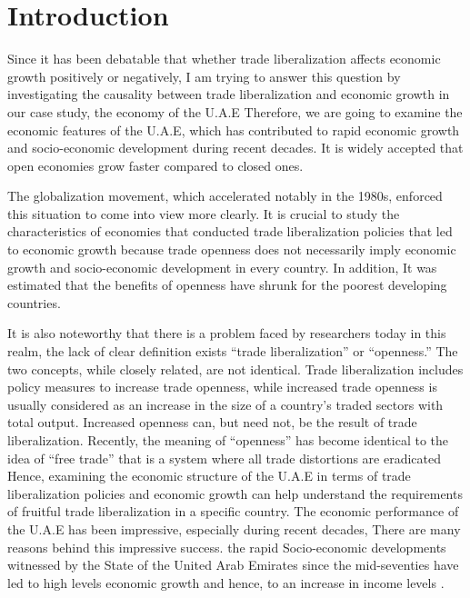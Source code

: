 \documentclass[12pt,a4 paper,title page]{article}
\begin{document}
\section{Introduction}
Since it has been debatable that whether trade liberalization affects economic growth positively or negatively, I am trying to answer this question by investigating the causality between trade liberalization and economic growth in our case study, the economy of the \ac{U.A.E} Therefore, we are going to examine the economic features of the \ac{U.A.E}, which has contributed to rapid economic growth and socio-economic development during  recent decades. It is widely accepted that open economies grow faster compared to closed ones.\citep{pigka2013impact}
\begin{flushleft}\justifying
 The globalization movement, which accelerated notably in the 1980s, enforced this situation to come into view more clearly.\citep{SHRESTHA201871}
It is crucial to study the characteristics of economies that conducted trade liberalization policies that led to economic growth because trade openness does not necessarily imply economic growth and socio-economic development in every country.\citep{borensztein1998does} In addition, It was estimated that the benefits of openness have shrunk for the poorest developing countries.\citep{pigka2013impact} \\
\end{flushleft}
\begin{flushleft}\justifying
It is also noteworthy that there is a problem faced by researchers today in this realm, the lack of clear definition exists “trade liberalization” or “openness.” The two concepts, while closely related, are not identical. Trade liberalization includes policy measures to increase trade openness, while increased trade openness is usually considered as an increase in the size of a
country’s traded sectors with total output. Increased openness can, but need not, be the result of trade liberalization. Recently, the meaning of “openness” has become identical to the idea of “free trade” that is a system where all trade distortions are eradicated 
\citep{pigka2013impact}
Hence, examining the economic structure of the U.A.E in terms of trade liberalization policies and economic growth can help understand the requirements of fruitful trade liberalization in a specific country.
The economic performance of the \ac{U.A.E} has been impressive, especially during recent decades, There are many reasons behind this impressive success. \citep{al2016trade}
the rapid Socio-economic developments witnessed by the State of the United Arab Emirates since the mid-seventies have led to high levels economic growth and hence, to an increase in income levels \citep{omaira2001economy}. \\
\end{flushleft}
\end{document}
